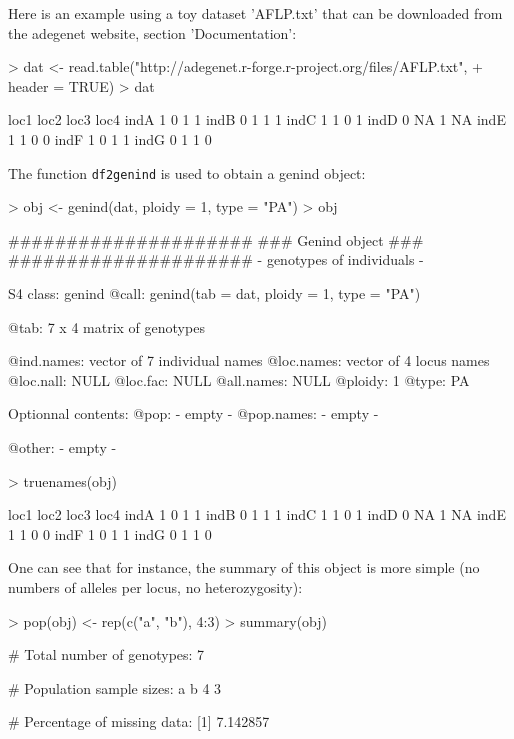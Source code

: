 \documentclass{article}
\begin{document}
Here is an example using a toy dataset 'AFLP.txt' that can be downloaded
from the adegenet website, section 'Documentation':
\begin{Schunk}
\begin{Sinput}
> dat <- read.table("http://adegenet.r-forge.r-project.org/files/AFLP.txt", 
+     header = TRUE)
> dat
\end{Sinput}
\begin{Soutput}
     loc1 loc2 loc3 loc4
indA    1    0    1    1
indB    0    1    1    1
indC    1    1    0    1
indD    0   NA    1   NA
indE    1    1    0    0
indF    1    0    1    1
indG    0    1    1    0
\end{Soutput}
\end{Schunk}
\noindent The function \texttt{df2genind} is used to obtain a genind object:
\begin{Schunk}
\begin{Sinput}
> obj <- genind(dat, ploidy = 1, type = "PA")
> obj
\end{Sinput}
\begin{Soutput}
   #####################
   ### Genind object ### 
   #####################
- genotypes of individuals - 

S4 class:  genind
@call: genind(tab = dat, ploidy = 1, type = "PA")

@tab:  7 x 4 matrix of genotypes

@ind.names: vector of  7 individual names
@loc.names: vector of  4 locus names
@loc.nall: NULL
@loc.fac: NULL
@all.names: NULL
@ploidy:  1
@type:  PA

Optionnal contents: 
@pop:  - empty -
@pop.names:  - empty -

@other: - empty -
\end{Soutput}
\begin{Sinput}
> truenames(obj)
\end{Sinput}
\begin{Soutput}
     loc1 loc2 loc3 loc4
indA    1    0    1    1
indB    0    1    1    1
indC    1    1    0    1
indD    0   NA    1   NA
indE    1    1    0    0
indF    1    0    1    1
indG    0    1    1    0
\end{Soutput}
\end{Schunk}

One can see that for instance, the summary of this object is more simple (no numbers of alleles per locus, no heterozygosity):
\begin{Schunk}
\begin{Sinput}
> pop(obj) <- rep(c("a", "b"), 4:3)
> summary(obj)
\end{Sinput}
\begin{Soutput}
 # Total number of genotypes:  7 

 # Population sample sizes:  
a b 
4 3 

 # Percentage of missing data:  
[1] 7.142857
\end{Soutput}
\end{Schunk}
\end{document}
